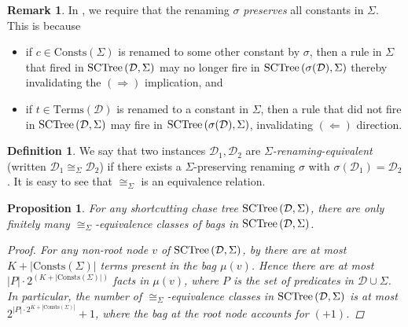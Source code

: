 \documentclass[12pt]{report}
\theoremstyle{plain}
\newtheorem{proposition}[theorem]{Proposition}
\theoremstyle{definition}
\newtheorem{definition}[theorem]{Definition}
\newtheorem{remark}[theorem]{Remark}
\def\Consts{{\mathrm{Consts}}}
\def\Terms{{\mathrm{Terms}}}
\newcommand{\SCTree}[2]{\ensuremath{\normalfont{\textrm{SCTree}} \left( #1, #2 \right)}}
\begin{document}
\begin{remark}
  In , we require that the renaming $\sigma$ \emph{preserves} all constants in $\Sigma$. This is because \begin{itemize}
    \item if $c \in \Consts(\Sigma)$ is renamed to some other constant by $\sigma$, then a rule in $\Sigma$ that fired in $\SCTree{\mathcal{D}}{\Sigma}$ may no longer fire in $\SCTree{\sigma(\mathcal{D})}{\Sigma}$ thereby invalidating the $(\Longrightarrow)$ implication, and
    \item if $t \in \Terms(\mathcal{D})$ is renamed to a constant in $\Sigma$, then a rule that did not fire in $\SCTree{\mathcal{D}}{\Sigma}$ may fire in $\SCTree{\sigma(\mathcal{D})}{\Sigma}$, invalidating $(\Longleftarrow)$ direction.
  \end{itemize}
\end{remark}

\begin{definition}
  We say that two instances $\mathcal{D}_1, \mathcal{D}_2$ are \emph{$\Sigma$-renaming-equivalent} (written $\mathcal{D}_1 \cong_\Sigma \mathcal{D}_2$) if there exists a $\Sigma$-preserving renaming $\sigma$ with $\sigma(\mathcal{D}_1) = \mathcal{D}_2$. It is easy to see that $\cong_\Sigma$ is an equivalence relation.
\end{definition}

\begin{proposition}
\label{renaming-equivalence-class-bound}
  For any shortcutting chase tree $\SCTree{\mathcal{D}}{\Sigma}$, there are only finitely many $\cong_\Sigma$-equivalence classes of bags in $\SCTree{\mathcal{D}}{\Sigma}$.
  \begin{proof}
    For any non-root node $v$ of $\SCTree{\mathcal{D}}{\Sigma}$, by  there are at most $K + |\Consts(\Sigma)|$ terms present in the bag $\mu(v)$. Hence there are at most $|P| \cdot 2^{(K + |\Consts(\Sigma)|)}$ facts in $\mu(v)$, where $P$ is the set of predicates in $\mathcal{D} \cup \Sigma$. In particular, the number of $\cong_\Sigma$-equivalence classes in $\SCTree{\mathcal{D}}{\Sigma}$ is at most $2^{|P| \cdot 2^{K + |\Consts(\Sigma)|}} + 1$, where the bag at the root node accounts for $(+1)$.
  \end{proof}
\end{proposition}
\end{document}
